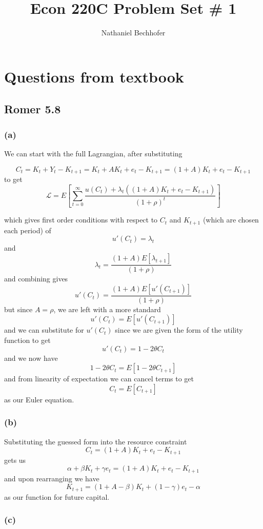 \documentclass[11pt]{amsart}
\title{Econ 220C Problem Set \# 1}
\author{Nathaniel Bechhofer}
\begin{document}
\maketitle

\section{Questions from textbook}

\subsection{Romer 5.8}

\subsubsection*{(a)}

We can start with the full Lagrangian, after substituting

\[
C_t = K_t + Y_t - K_{t+1} =  K_t + A K_t + e_t - K_{t+1}  = (1 + A) K_t + e_t - K_{t+1}
\]
to get
\[
\mathcal{L} = E \left[ \sum_{t=0}^{\infty} \frac{u(C_t) + \lambda_t ((1 + A) K_t + e_t - K_{t+1})}{(1+\rho)^t} \right]
\]

which gives first order conditions with respect to $C_t$ and $K_{t+1}$ (which are chosen each period) of
\[
u'(C_t) = \lambda_t
\]
and
\[
\lambda_t = \frac{(1+A) E[\lambda_{t+1}]}{(1+\rho)}
\]
and combining gives
\[
u'(C_t) = \frac{(1+A) E[u'(C_{t+1})]}{(1+\rho)}
\]
but since $A=\rho$, we are left with a more standard
\[
u'(C_t) = E[u'(C_{t+1})]
\]
and we can substitute for $u'(C_t)$ since we are given the form of the utility function to get
\[
u'(C_t) = 1 - 2 \theta C_t
\]
and we now have
\[
1 - 2 \theta C_t = E[1 - 2 \theta C_{t+1}]
\]
and from linearity of expectation we can cancel terms to get
\[
C_t = E[C_{t+1}]
\]
as our Euler equation.

\subsubsection*{(b)}

Substituting the guessed form into the resource constraint
\[
C_t = (1 + A) K_t + e_t - K_{t+1}
\]
gets us
\[
\alpha + \beta K_t + \gamma e_t = (1 + A) K_t + e_t - K_{t+1}
\]
and upon rearranging we have
\[
K_{t+1} = (1 + A - \beta) K_t + (1-\gamma) e_t - \alpha
\]
as our function for future capital.

\subsubsection*{(c)}
\end{document}
